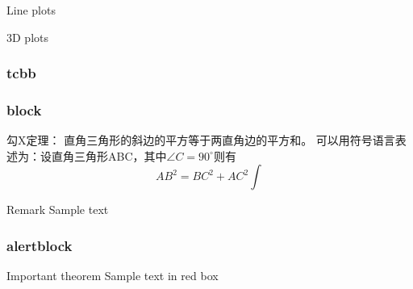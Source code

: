 \begin{frame}{Line plots}
  \begin{figure}
  \end{figure}
\end{frame}


\begin{frame}{3D plots}
\begin{figure}
\end{figure}
\end{frame}

\begin{frame}
  \frametitle{tcbb}
  \centering
\end{frame}

\begin{frame}\frametitle{block}
	\begin{block}{勾X定理：}
		直角三角形的斜边的平方等于两直角边的平方和。
		可以用符号语言表述为：设直角三角形ABC，其中$\angle C=90^\circ $则有
		\begin{equation}
			AB^2=BC^2+AC^2 \int
		\end{equation}
	\end{block}
	\begin{block}{Remark}
		Sample text
	\end{block}
\end{frame}

\begin{frame}
    \frametitle{alertblock}
	\begin{alertblock}{Important theorem}
		Sample text in red box
	\end{alertblock}
\end{frame}

